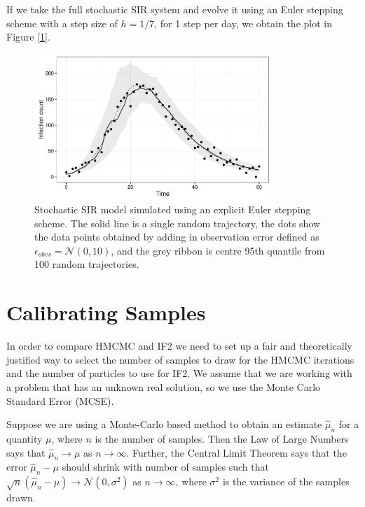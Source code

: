     If we take the full stochastic SIR system and evolve it using an Euler stepping scheme with a step size of $h = 1/7$, for 1 step per day, we obtain the plot in Figure [\ref{sirmean}].

    \begin{figure}[H]
        \centering
        \captionsetup{width=.8\linewidth}
        \includegraphics[width=0.8\textwidth]{./images/sirmean.pdf}
        \caption{Stochastic SIR model simulated using an explicit Euler stepping scheme. The solid line is a single random trajectory, the dots show the data points obtained by adding in observation error defined as $\epsilon_{obvs} = \mathcal{N}(0,10)$, and the grey ribbon is centre 95th quantile from 100 random trajectories.}
        \label{sirmean}
    \end{figure}


\section{Calibrating Samples}

	In order to compare HMCMC and IF2 we need to set up a fair and theoretically justified way to select the number of samples to draw for the HMCMC iterations and the number of particles to use for IF2. We assume that we are working with a problem that has an unknown real solution, so we use the Monte Carlo Standard Error (MCSE).

	Suppose we are using a Monte-Carlo based method to obtain an estimate $\hat{\mu}_{n}$ for a quantity $\mu$, where $n$ is the number of samples. Then the Law of Large Numbers says that $\hat{\mu}_{n} \rightarrow \mu$ as $n \rightarrow \infty$. Further, the Central Limit Theorem says that the error $\hat{\mu}_{n} - \mu$ should shrink with number of samples such that $\sqrt{n} (\hat{\mu}_{n} - \mu) \rightarrow \mathcal{N}(0,\sigma^2)$ as $n \rightarrow \infty$, where $\sigma^2$ is the variance of the samples drawn.

